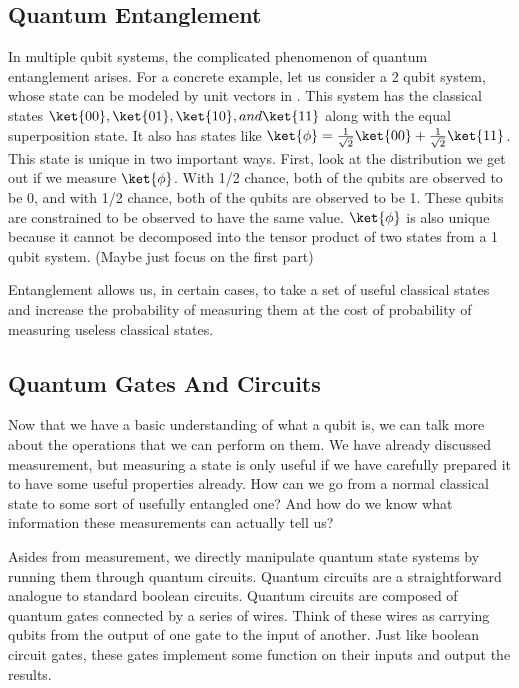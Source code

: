 \subsection{Quantum Entanglement}
\label{sec:entangle}
In multiple qubit systems, the complicated phenomenon of quantum entanglement arises.
For a concrete example, let us consider a 2 qubit system, whose state can be modeled by unit vectors in .
This system has the classical states $\ket{00}, \ket{01}, \ket{10}, and \ket{11}$ along with the equal superposition state.
It also has states like $\ket{\phi} = \frac{1}{\sqrt{2}}\ket{00} + \frac{1}{\sqrt{2}}\ket{11}$.
This state is unique in two important ways.
First, look at the distribution we get out if we measure $\ket{\phi}$.
With 1/2 chance, both of the qubits are observed to be 0, and with 1/2 chance, both of the qubits are observed to be 1.
These qubits are constrained to be observed to have the same value. 
$\ket{\phi}$ is also unique because it cannot be decomposed into the tensor product of two states from a 1 qubit system. 
(Maybe just focus on the first part)
	
Entanglement allows us, in certain cases, to take a set of useful classical states and increase the probability of measuring them at the cost of probability of measuring useless classical states. 
\subsection{Quantum Gates And Circuits}
\label{sec:gates_circs}
Now that we have a basic understanding of what a qubit is, we can talk more about the operations that we can perform on them.
We have already discussed measurement, but measuring a state is only useful if we have carefully prepared it to have some useful properties already.
How can we go from a normal classical state to some sort of usefully entangled one?
And how do we know what information these measurements can actually tell us?

Asides from measurement, we directly manipulate quantum state systems by running them through quantum circuits.
Quantum circuits are a straightforward analogue to standard boolean circuits.
Quantum circuits are composed of quantum gates connected by a series of wires.
Think of these wires as carrying qubits from the output of one gate to the input of another.
Just like boolean circuit gates, these gates implement some function on their inputs and output the results. 

